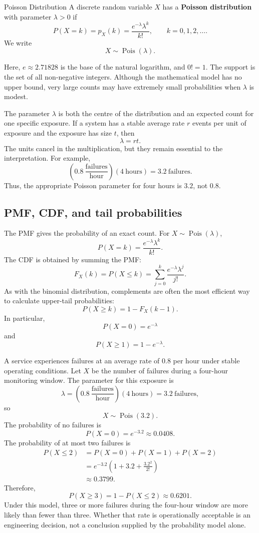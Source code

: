 \begin{definition}{Poisson Distribution}
    A discrete random variable $X$ has a \textbf{Poisson distribution} with parameter $\lambda>0$ if
    \[
    P(X=k)
    =p_X(k)
    =\frac{e^{-\lambda}\lambda^k}{k!},
    \qquad k=0,1,2,\ldots.
    \]
    We write
    \[
    X\sim\operatorname{Pois}(\lambda).
    \]
\end{definition}

Here, $e\approx2.71828$ is the base of the natural logarithm, and $0!=1$. The support is the set of all non-negative integers. Although the mathematical model has no upper bound, very large counts may have extremely small probabilities when $\lambda$ is modest.

The parameter $\lambda$ is both the centre of the distribution and an expected count for one specific exposure. If a system has a stable average rate $r$ events per unit of exposure and the exposure has size $t$, then
\[
\lambda=rt.
\]
The units cancel in the multiplication, but they remain essential to the interpretation. For example,
\[
\left(0.8\ \frac{\text{failures}}{\text{hour}}\right)
(4\ \text{hours})
=3.2\ \text{failures}.
\]
Thus, the appropriate Poisson parameter for four hours is $3.2$, not $0.8$.

\subsection{PMF, CDF, and tail probabilities}

The PMF gives the probability of an exact count. For $X\sim\operatorname{Pois}(\lambda)$,
\[
P(X=k)=\frac{e^{-\lambda}\lambda^k}{k!}.
\]
The CDF is obtained by summing the PMF:
\[
F_X(k)
=P(X\leq k)
=\sum_{j=0}^{k}\frac{e^{-\lambda}\lambda^j}{j!}.
\]
As with the binomial distribution, complements are often the most efficient way to calculate upper-tail probabilities:
\[
P(X\geq k)=1-F_X(k-1).
\]
In particular,
\[
P(X=0)=e^{-\lambda}
\]
and
\[
P(X\geq1)=1-e^{-\lambda}.
\]

\begin{example}\par
A service experiences failures at an average rate of $0.8$ per hour under stable operating conditions. Let $X$ be the number of failures during a four-hour monitoring window. The parameter for this exposure is
\[
\lambda
=\left(0.8\ \frac{\text{failures}}{\text{hour}}\right)
(4\ \text{hours})
=3.2\ \text{failures},
\]
so
\[
X\sim\operatorname{Pois}(3.2).
\]
The probability of no failures is
\[
P(X=0)=e^{-3.2}\approx0.0408.
\]
The probability of at most two failures is
\[
\begin{aligned}
P(X\leq2)
&=P(X=0)+P(X=1)+P(X=2)\\
&=e^{-3.2}\left(1+3.2+\frac{3.2^2}{2!}\right)\\
&\approx0.3799.
\end{aligned}
\]
Therefore,
\[
P(X\geq3)=1-P(X\leq2)\approx0.6201.
\]
Under this model, three or more failures during the four-hour window are more likely than fewer than three. Whether that rate is operationally acceptable is an engineering decision, not a conclusion supplied by the probability model alone.
\end{example}


